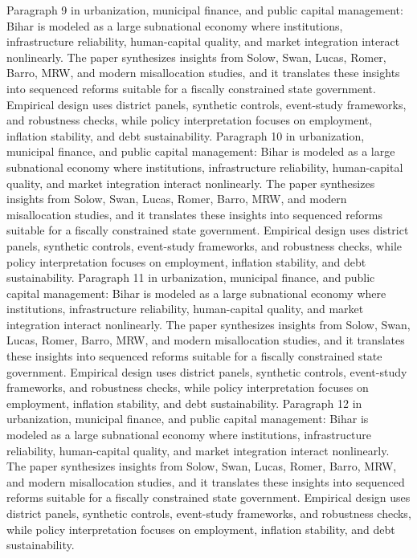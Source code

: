 \documentclass[preprint,12pt]{elsarticle}
\begin{document}
Paragraph 9 in urbanization, municipal finance, and public capital management: Bihar is modeled as a large subnational economy where institutions, infrastructure reliability, human-capital quality, and market integration interact nonlinearly. The paper synthesizes insights from Solow, Swan, Lucas, Romer, Barro, MRW, and modern misallocation studies, and it translates these insights into sequenced reforms suitable for a fiscally constrained state government. Empirical design uses district panels, synthetic controls, event-study frameworks, and robustness checks, while policy interpretation focuses on employment, inflation stability, and debt sustainability.
Paragraph 10 in urbanization, municipal finance, and public capital management: Bihar is modeled as a large subnational economy where institutions, infrastructure reliability, human-capital quality, and market integration interact nonlinearly. The paper synthesizes insights from Solow, Swan, Lucas, Romer, Barro, MRW, and modern misallocation studies, and it translates these insights into sequenced reforms suitable for a fiscally constrained state government. Empirical design uses district panels, synthetic controls, event-study frameworks, and robustness checks, while policy interpretation focuses on employment, inflation stability, and debt sustainability.
Paragraph 11 in urbanization, municipal finance, and public capital management: Bihar is modeled as a large subnational economy where institutions, infrastructure reliability, human-capital quality, and market integration interact nonlinearly. The paper synthesizes insights from Solow, Swan, Lucas, Romer, Barro, MRW, and modern misallocation studies, and it translates these insights into sequenced reforms suitable for a fiscally constrained state government. Empirical design uses district panels, synthetic controls, event-study frameworks, and robustness checks, while policy interpretation focuses on employment, inflation stability, and debt sustainability.
Paragraph 12 in urbanization, municipal finance, and public capital management: Bihar is modeled as a large subnational economy where institutions, infrastructure reliability, human-capital quality, and market integration interact nonlinearly. The paper synthesizes insights from Solow, Swan, Lucas, Romer, Barro, MRW, and modern misallocation studies, and it translates these insights into sequenced reforms suitable for a fiscally constrained state government. Empirical design uses district panels, synthetic controls, event-study frameworks, and robustness checks, while policy interpretation focuses on employment, inflation stability, and debt sustainability.
\end{document}
